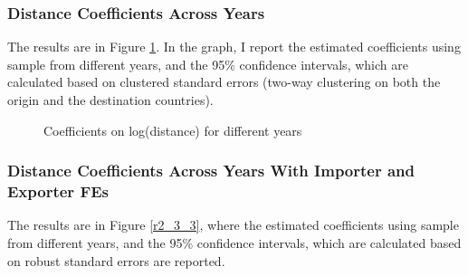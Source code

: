 \documentclass[12pt]{article}
\theoremstyle{definition}
\begin{document}
\newpage 
\subsubsection{Distance Coefficients Across Years}

The results are in Figure \ref{r2_3_2}. In the graph, I report the estimated coefficients using sample from different years, and the 95\% confidence intervals, which are calculated based on clustered standard errors (two-way clustering on both the origin and the destination countries).

\begin{figure}[H]
    \noindent\caption{Coefficients on log(distance) for different years}
    \begin{center}
        \label{r2_3_2}
    \end{center}
\end{figure}

\newpage 
\subsubsection{Distance Coefficients Across Years With Importer and Exporter FEs}

The results are in Figure \ref{r2_3_3}, where the estimated coefficients using sample from different years, and the 95\% confidence intervals, which are calculated based on robust standard errors are reported.
\end{document}
